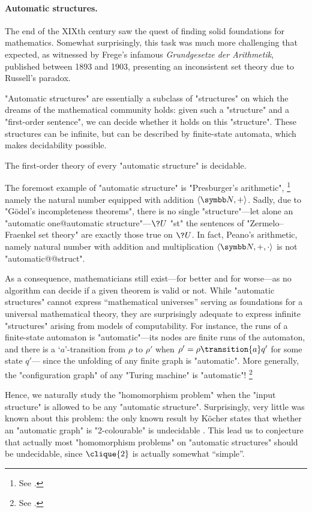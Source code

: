 \paragraph*{Automatic structures.}
The end of the XIXth century saw the quest of finding solid foundations
for mathematics. Somewhat surprisingly, this task was much more challenging that expected,
as witnessed by Frege's infamous \emph{Grundgesetze der Arithmetik},
published between 1893 and 1903, presenting an inconsistent set theory due to Russell's paradox.

"Automatic structures" are essentially a subclass of "structures" on which the dreams of
the mathematical community holds: given such a "structure" and a "first-order sentence",
we can decide whether it holds on this "structure". These structures can be infinite,
but can be described by finite-state automata, which makes decidability possible.

\begin{known}
	The first-order theory of every "automatic structure" is decidable.
\end{known}

The foremost example of "automatic structure" is "Presburger's arithmetic",%
\footnote{See .}
namely the natural number equipped with addition $\tup{\N, +}$.
Sadly, due to "Gödel's incompleteness theorems", there is no single "structure"---let alone an "automatic one@automatic structure"---$\?U$ "st" the sentences of "Zermelo–Fraenkel set theory"
are exactly those true on $\?U$. In fact, Peano's arithmetic, namely natural number with
addition and multiplication $\tup{\N,+,\cdot}$ is not "automatic@@struct".

As a consequence, mathematicians still exist---for better and for worse---as no algorithm
can decide if a given theorem is valid or not.
While "automatic structures" cannot express ``mathematical universes'' serving as
foundations for a universal mathematical theory, they are surprisingly adequate to
express infinite "structures" arising from models of computability.
For instance, the runs of a finite-state automaton is "automatic"---its nodes
are finite runs of the automaton, and there is a `$a$'-transition from
$\rho$ to $\rho'$ when $\rho' = \rho \transition{a} q'$ for some state $q'$---
since the unfolding of any finite graph is "automatic".
More generally, the "configuration graph" of any "Turing machine" is "automatic"!%
\footnote{See .}

Hence, we naturally study the "homomorphism problem" when the "input structure"
is allowed to be any "automatic structure". Surprisingly, very little was known about this problem:
the only known result by Köcher states that whether an "automatic graph" is "2-colourable" is undecidable \cite{Kocher2014AutomatischenGraphen}.
This lead us to conjecture that actually most "homomorphism problems" on "automatic structures"
should be undecidable, since $\clique{2}$ is actually somewhat ``simple''.

